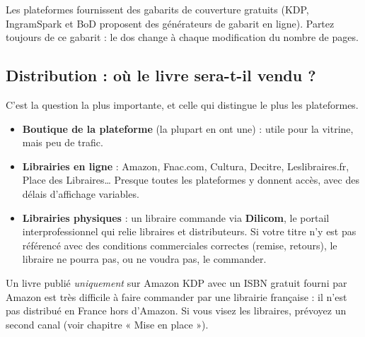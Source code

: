 \begin{astuce}
Les plateformes fournissent des gabarits de couverture gratuits (KDP,
IngramSpark et BoD proposent des générateurs de gabarit en ligne).
Partez toujours de ce gabarit : le dos change à chaque modification du
nombre de pages.
\end{astuce}

\subsection{Distribution : où le livre sera-t-il vendu ?}

C’est la question la plus importante, et celle qui distingue le plus les
plateformes.

\begin{itemize}
  \item \textbf{Boutique de la plateforme} (la plupart en ont une) : utile
        pour la vitrine, mais peu de trafic.
  \item \textbf{Librairies en ligne} : Amazon, Fnac.com, Cultura,
        Decitre, Leslibraires.fr, Place des Libraires… Presque toutes les
        plateformes y donnent accès, avec des délais d’affichage variables.
  \item \textbf{Librairies physiques} : un libraire commande via
        \textbf{Dilicom}, le portail interprofessionnel qui relie libraires
        et distributeurs. Si votre titre n’y est pas référencé avec des
        conditions commerciales correctes (remise, retours), le libraire
        ne pourra pas, ou ne voudra pas, le commander.
\end{itemize}

\begin{attention}
Un livre publié \emph{uniquement} sur Amazon KDP avec un ISBN gratuit
fourni par Amazon est très difficile à faire commander par une librairie
française : il n’est pas distribué en France hors d’Amazon. Si vous visez
les libraires, prévoyez un second canal (voir chapitre « Mise en place »).
\end{attention}
